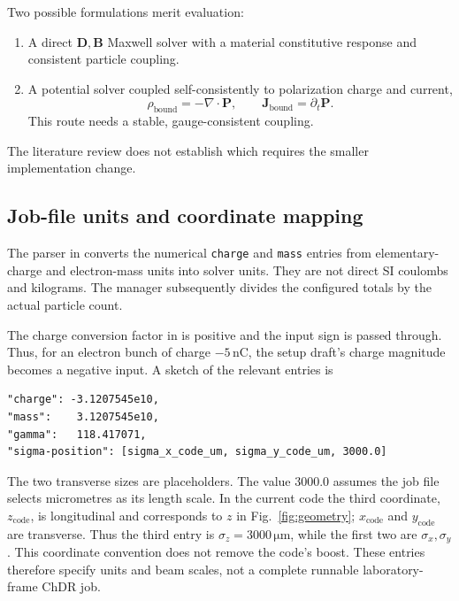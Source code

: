 \documentclass[11pt,a4paper]{article}
\newcommand{\unit}[1]{\,\mathrm{#1}}
\newcommand{\code}[1]{\texttt{\small #1}}
\numberwithin{equation}{section}
\begin{document}
Two possible formulations merit evaluation:
\begin{enumerate}
 \item A direct \(\mathbf D,\mathbf B\) Maxwell solver with a material
       constitutive response and consistent particle coupling.
 \item A potential solver coupled self-consistently to polarization
       charge and current,
       \begin{equation}
       \rho_{\mathrm{bound}}=-\nabla\cdot\mathbf P,\qquad
       \mathbf J_{\mathrm{bound}}=\partial_t\mathbf P.
       \end{equation}
       This route needs a stable, gauge-consistent coupling.
\end{enumerate}
The literature review does not establish which requires the smaller
implementation change.

\subsection{Job-file units and coordinate mapping}

The parser in  converts the numerical
\code{charge} and \code{mass} entries from elementary-charge and
electron-mass units into solver units. They are not direct SI coulombs
and kilograms. The manager subsequently divides the configured totals
by the actual particle count.

The charge conversion factor in  is positive and
the input sign is passed through. Thus, for an electron bunch of charge
\(-5\unit{nC}\), the setup draft's charge magnitude becomes a negative
input. A sketch of the relevant entries is
\begin{verbatim}
"charge": -3.1207545e10,
"mass":    3.1207545e10,
"gamma":   118.417071,
"sigma-position": [sigma_x_code_um, sigma_y_code_um, 3000.0]
\end{verbatim}
The two transverse sizes are placeholders. The value \(3000.0\) assumes
the job file selects micrometres as its length scale. In the current code
the third coordinate, \(z_{\mathrm{code}}\), is longitudinal and corresponds
to \(z\) in Fig.~\ref{fig:geometry}; \(x_{\mathrm{code}}\) and
\(y_{\mathrm{code}}\) are transverse. Thus the third entry is
\(\sigma_z=3000\unit{\mu m}\), while the first two are \(\sigma_x,\sigma_y\).
This coordinate convention does not remove the code's boost.
These entries therefore specify units
and beam scales, not a complete runnable laboratory-frame ChDR job.
\end{document}
